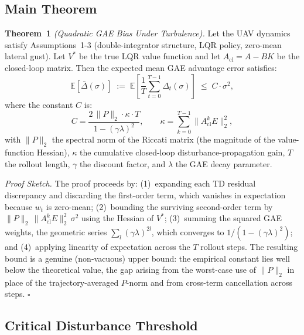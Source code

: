 \documentclass[10pt, conference]{IEEEtran}
\begin{document}
\subsection{Main Theorem}

\textbf{Theorem~1} \textit{(Quadratic GAE Bias Under Turbulence).} Let
the UAV dynamics satisfy Assumptions~1-3 (double-integrator structure,
LQR policy, zero-mean lateral gust). Let $V^*$ be the true LQR value
function and let $A_{\mathrm{cl}} = A - BK$ be the closed-loop matrix.
Then the expected mean GAE advantage error satisfies:
\begin{equation}
  \mathbb{E}[\bar{\Delta}(\sigma)] \;:=\;
  \mathbb{E}\!\left[\frac{1}{T}\sum_{t=0}^{T-1}\Delta_t(\sigma)\right]
  \;\leq\; C\cdot\sigma^{2},
\end{equation}
where the constant $C$ is:
\begin{equation}
  \label{eq:C}
  C = \frac{2\,\|P\|_2 \cdot \kappa \cdot T}{1 - (\gamma\lambda)^2},
  \qquad
  \kappa = \sum_{k=0}^{T-1}\big\|A_{\mathrm{cl}}^{k}E\big\|_2^2,
\end{equation}
with $\|P\|_2$ the spectral norm of the Riccati matrix (the magnitude of
the value-function Hessian), $\kappa$ the cumulative closed-loop
disturbance-propagation gain, $T$ the rollout length, $\gamma$ the
discount factor, and $\lambda$ the GAE decay parameter.

\textit{Proof Sketch.} The proof proceeds by: (1)~expanding each TD
residual discrepancy and discarding the first-order term, which vanishes
in expectation because $w_t$ is zero-mean; (2)~bounding the surviving
second-order term by $\|P\|_2\,\|A_{\mathrm{cl}}^{k}E\|_2^2\,\sigma^2$
using the Hessian of $V^*$; (3)~summing the squared GAE weights, the
geometric series $\sum_l (\gamma\lambda)^{2l}$, which converges to
$1/(1-(\gamma\lambda)^2)$; and (4)~applying linearity of expectation
across the $T$ rollout steps. The resulting bound is a genuine (non-vacuous)
upper bound: the empirical constant lies well below the theoretical value,
the gap arising from the worst-case use of $\|P\|_2$ in place of the
trajectory-averaged $P$-norm and from cross-term cancellation across
steps. $\square$

\subsection{Critical Disturbance Threshold}
\end{document}
